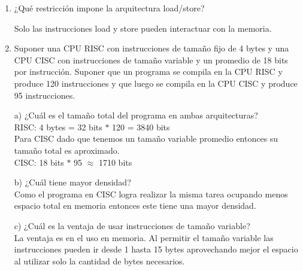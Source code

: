 \documentclass[a4paper, 11pt]{article}
\newcommand{\Pspace}{0.5cm}
\newcommand{\Aspace}{0.2cm}
\begin{document}
\begin{enumerate}
    \vspace{\Pspace}
    \item ¿Qué restricción impone la arquitectura load/store? \par
        \vspace{\Aspace} \par
        { \color{azul} Solo las instrucciones load y store pueden interactuar con la memoria. }



    \vspace{\Pspace}
    \item Suponer una CPU RISC con instrucciones de tamaño fijo de 4 bytes y una CPU CISC con instrucciones de tamaño variable y un promedio de 18 bits por instrucción. Suponer que un programa se compila en la CPU RISC y produce 120 instrucciones y que luego se compila en la CPU CISC y produce 95 instrucciones. \par
        \vspace{\Aspace} \par
        a) ¿Cuál es el tamaño total del programa en ambas arquitecturas?
        \\ { \color{azul} 
            RISC: 4 bytes = 32 bits $*$ 120 = 3840 bits \\
            Para CISC dado que tenemos un tamaño variable promedio entonces su tamaño total es aproximado. \\
            CISC: 18 bits $*$ 95 $\approx$ 1710 bits
        }

        \vspace{\Aspace} \par
        b) ¿Cuál tiene mayor densidad?
        \\ { \color{azul} 
            Como el programa en CISC logra realizar la misma tarea ocupando menos espacio total en memoria entonces este tiene una mayor densidad.
        }

        \vspace{\Aspace} \par
        c) ¿Cuál es la ventaja de usar instrucciones de tamaño variable?
        \\ { \color{azul} 
            La ventaja es en el uso en memoria. Al permitir el tamaño variable las instrucciones pueden ir desde 1 hasta 15 bytes aprovechando mejor el espacio al utilizar solo la cantidad de bytes necesarios.
        }




\end{enumerate}
\end{document}
